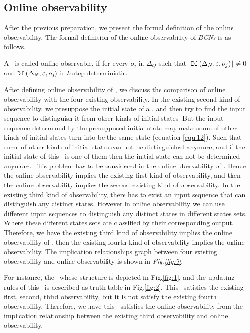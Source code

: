 \subsection{Online observability}
After the previous preparation, we present the formal definition of the online observability. The formal definition of the online observability of {\em BCNs} is as follows.
\begin{definition}
 A \BCN\ is called online observable,
if for every  $o_j$ in $\Delta_Q$ such that $|{\tt Df}\left(\Delta_N,\varepsilon, o_j\right)|\neq 0$ and ${\tt Df}\left(\Delta_N,\varepsilon,o_j\right)$ is $k$-step deterministic.
\end{definition}


After defining online observability of \BCNs, we discuss the comparison of online observability with the four existing observability. In the existing second kind of observability, we presuppose the initial state of a \BCN, and then try to find the input sequence to distinguish it from other kinds of initial states. But the input sequence determined by the presupposed initial state may make some of other kinds of initial states turn into be the same state (equation \ref{equ:12}). Such that some of other kinds of initial states can not be distinguished anymore, and if the initial state of this \BCN\ is one of them then the initial state can not be determined anymore. This problem has to be considered in the online obervability of \BCNs. Hence the online observability implies the existing first kind of observability, and then the online observability implies the second existing kind of observability. In the existing third kind of observability, there has to exist an input sequence that can distinguish any distinct states. However in online observability we can use different input sequences to distinguish any distinct states in different states sets. Where these different states sets are classified by their corresponding output. Therefore, we have the existing third kind of observability implies the online observability of \BCNs, then the existing fourth kind of observability implies the online observability. The implication relationships graph between four existing observability and online observability is shown in {\em Fig.\ref{fig:7}}.
\begin{example}
For instance, the \BCN\ whose structure is depicted in Fig.\ref{fig:1}, and the updating rules of this \BCN\ is described as truth table in Fig.\ref{fig:2}. This \BCN\ satisfies the existing first, second, third observability, but it is not satisfy the existing fourth observability. Therefore, we have this \BCN\ satisfies the online observability from the implication relationship between the existing third observability and online observability.
\end{example}   

